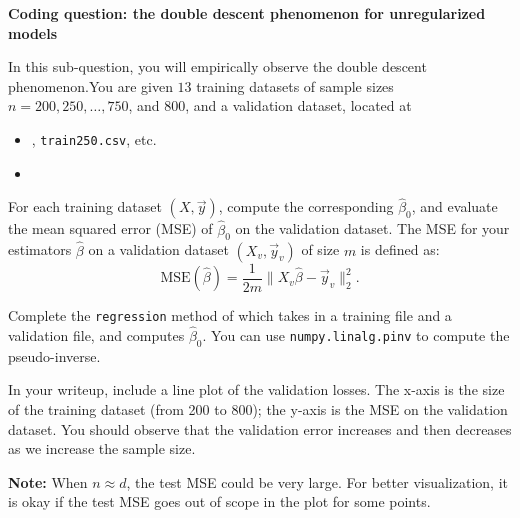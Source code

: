 \item {} \textbf{Coding question: the double descent phenomenon for unregularized models}

In this sub-question, you will empirically observe the double descent phenomenon.You are given $13$ training datasets of sample sizes $n  = 200, 250, \dots, 750$, and $800$, and a validation dataset, located at
\begin{itemize}
	\item {}, \texttt{train250.csv}, etc.
	\item {}
\end{itemize} 

For each training dataset $(X, \vec{y})$, compute the corresponding $\hat{\beta}_0$, and evaluate the mean squared error (MSE) of $\hat{\beta}_0$ on the validation dataset. The MSE for your estimators $\hat{\beta}$ on a validation dataset $(X_v, \vec{y}_v)$ of size $m$ is defined as: $$\text{MSE}(\hat{\beta}) = \frac{1}{2m} \|X_v \hat{\beta}-\vec{y}_v\|^2_2.$$


Complete the \texttt{regression} method of  which takes in a training file and a validation file, and computes $\hat{\beta}_0$. You can use \texttt{numpy.linalg.pinv} to compute the pseudo-inverse.

In your writeup, include a line plot of the validation losses. The x-axis is the size of the training dataset (from 200 to 800); the y-axis is the MSE on the validation dataset. You should observe that the validation error increases and then decreases as we increase the sample size.  

\textbf{Note:} When $n\approx d$, the test MSE could be very large. For better visualization, it is okay if the test MSE goes out of scope in the plot for some points.